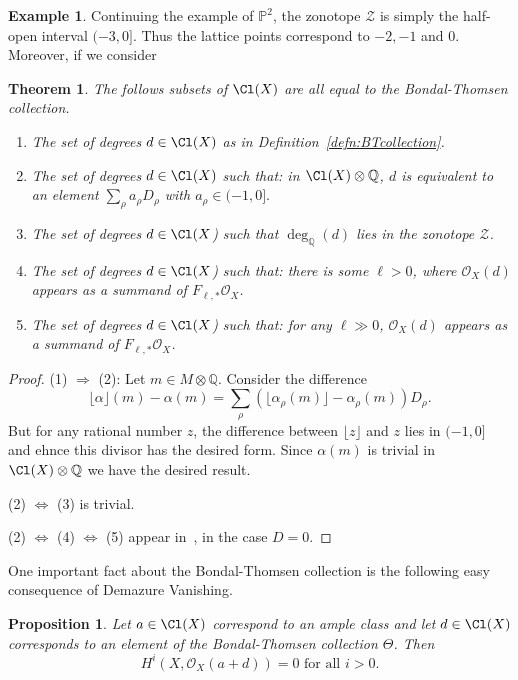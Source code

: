 \documentclass[11pt]{amsart}
\numberwithin{equation}{section}
\newtheorem{prop}[equation]{Proposition}
\newtheorem{thm}[equation]{Theorem}
\theoremstyle{definition}
\newtheorem{example}[equation]{Example}
\theoremstyle{remark}
\newcommand{\PP}{\mathbb P}
\newcommand{\QQ}{\mathbb Q}
\newcommand{\cO}{{\mathcal O}}
\begin{document}
\begin{example}
    Continuing the example of $\PP^2$, the zonotope $\mathcal Z$ is simply the half-open interval $(-3,0]$.  Thus the lattice points correspond to $-2,-1$ and $0$.  Moreover, if we consider
\end{example}
\begin{thm}
    The follows subsets of $\Cl(X)$ are all equal to the Bondal-Thomsen collection.
    \begin{enumerate}
        \item  The set of degrees $d\in \Cl(X)$ as in Definition~\ref{defn:BTcollection}.
        \item  The set of degrees $d\in \Cl(X)$ such that: in $\Cl(X)\otimes \QQ$, $d$ is equivalent to an element $\sum_{\rho} a_\rho D_\rho$ with $a_\rho \in (-1,0].$
        \item  The set of degrees $d\in \Cl(X$) such that $\deg_{\QQ}(d)$ lies in the zonotope $\mathcal Z$.
        \item  The set of degrees $d\in \Cl(X$) such that: there is some $\ell>0$, where $\cO_X(d)$ appears as a summand of $F_{\ell,*}\cO_X$.
        \item  The set of degrees $d\in \Cl(X$) such that: for any $\ell\gg 0$, $\cO_X(d)$ appears as a summand of $F_{\ell,*}\cO_X$.
    \end{enumerate}
\end{thm}
\begin{proof}
(1) $\Rightarrow$ (2):
Let $m \in M\otimes \QQ$.  Consider the difference
\[
\lfloor \alpha \rfloor(m) - \alpha(m) = \sum_{\rho} \left(\lfloor \alpha_\rho(m) \rfloor - \alpha_\rho(m)\right) D_\rho.
\]
But for any rational number $z$, the difference between $\lfloor z\rfloor$ and $z$ lies in $(-1,0]$ and ehnce this divisor has the desired form.  Since $\alpha(m)$ is trivial in $\Cl(X)\otimes \QQ$ we have the desired result.


(2) $\iff$  (3) is trivial.

(2) $\iff$ (4) $\iff$ (5) appear in~\cite[Theorem 2]{achinger}, in the case $D=0$.
\end{proof}

One important fact about the Bondal-Thomsen collection is the following easy consequence of Demazure Vanishing.

\begin{prop}
    Let $a\in \Cl(X)$ correspond to an ample class and let $d\in \Cl(X)$ corresponds to an element of the Bondal-Thomsen collection $\Theta$.  Then 
    \[
    H^i(X,\cO_X(a+d)) = 0 \text{ for all } i>0.
    \]
\end{prop}
\end{document}
